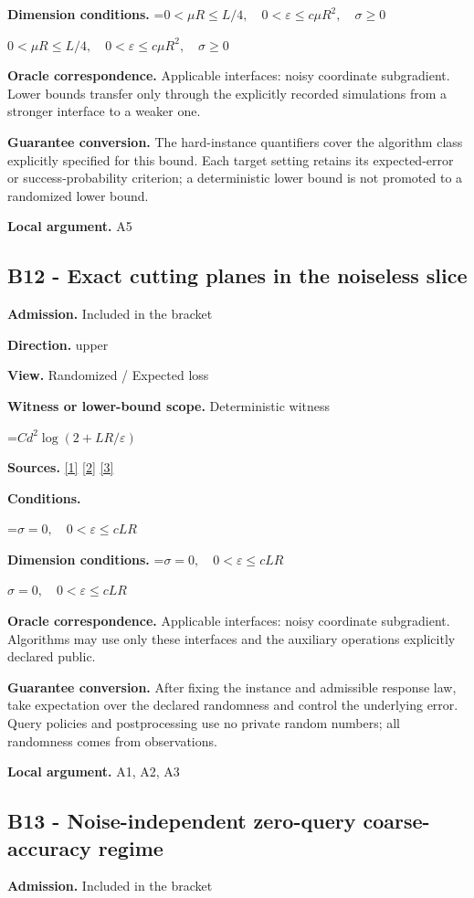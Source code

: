 \documentclass[10pt,a4paper]{article}
\newcommand{\AtlasMath}[1]{\par\begingroup\centering\setbox0=\hbox{$\displaystyle #1$}\ifdim\wd0>1.4\linewidth\typeout{ATLAS WIDE FORMULA: \the\wd0}\fi\ifdim\wd0>\linewidth\resizebox{\linewidth}{!}{\box0}\else\box0\fi\par\endgroup}
\newcommand{\AtlasInlineMath}[1]{\begingroup\setbox0=\hbox{$#1$}\ifdim\wd0>.4\linewidth\endgroup\AtlasMath{#1}\else\endgroup$#1$\fi}
\begin{document}
\textbf{Dimension conditions.} \AtlasInlineMath{0<\mu R\le L/4,\quad0<\varepsilon\le c\mu R^2,\quad\sigma\ge0}

\textbf{Oracle correspondence.} Applicable interfaces: noisy coordinate subgradient. Lower bounds transfer only through the explicitly recorded simulations from a stronger interface to a weaker one.

\textbf{Guarantee conversion.} The hard-instance quantifiers cover the algorithm class explicitly specified for this bound. Each target setting retains its expected-error or success-probability criterion; a deterministic lower bound is not promoted to a randomized lower bound.

\textbf{Local argument.} A5

\subsection{B12 - Exact cutting planes in the noiseless slice}
\textbf{Admission.} Included in the bracket

\textbf{Direction.} upper

\textbf{View.} Randomized / Expected loss

\textbf{Witness or lower-bound scope.} Deterministic witness

\AtlasMath{Cd^2\log(2+LR/\varepsilon)}
\textbf{Sources.} \href{https://arxiv.org/pdf/1405.4980}{[1]} \href{https://www2.isye.gatech.edu/~nemirovs/MOR_AccuracyCertificates.pdf}{[2]} \href{https://arxiv.org/pdf/2609.20701}{[3]}

\textbf{Conditions.} 
\AtlasMath{\sigma=0,\quad0<\varepsilon\le cLR}


\textbf{Dimension conditions.} \AtlasInlineMath{\sigma=0,\quad0<\varepsilon\le cLR}

\textbf{Oracle correspondence.} Applicable interfaces: noisy coordinate subgradient. Algorithms may use only these interfaces and the auxiliary operations explicitly declared public.

\textbf{Guarantee conversion.} After fixing the instance and admissible response law, take expectation over the declared randomness and control the underlying error. Query policies and postprocessing use no private random numbers; all randomness comes from observations.

\textbf{Local argument.} A1, A2, A3

\subsection{B13 - Noise-independent zero-query coarse-accuracy regime}
\textbf{Admission.} Included in the bracket
\end{document}
